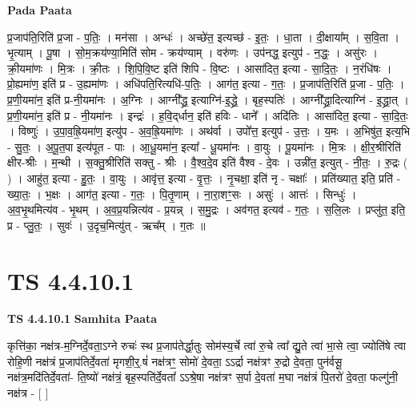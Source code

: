 \documentclass[17pt]{extarticle}
\begin{document}
\textbf{Pada Paata} \newline

प्र॒जाप॑ति॒रिति॑ प्र॒जा - प॒तिः॒ । मन॑सा । अन्धः॑ । अच्छे॑त॒ इत्यच्छ॑ - इ॒तः॒ । धा॒ता । दी॒क्षाया᳚म् । स॒वि॒ता । भृ॒त्याम् । पू॒षा । सो॒म॒क्रय॑ण्या॒मिति॑ सोम - क्रय॑ण्याम् । वरु॑णः । उप॑नद्ध॒ इत्युप॑ - न॒द्धः॒ । असु॑रः । क्री॒यमा॑णः । मि॒त्रः । क्री॒तः । शि॒पि॒वि॒ष्ट इति॑ शिपि - वि॒ष्टः । आसा॑दित॒ इत्या - सा॒दि॒तः॒ । न॒रंधि॑षः । प्रो॒ह्यमा॑ण॒ इति॑ प्र - उ॒ह्यमा॑णः । अधि॑पति॒रित्यधि॑-प॒तिः॒ । आग॑त॒ इत्या - ग॒तः॒ । प्र॒जाप॑ति॒रिति॑ प्र॒जा - प॒तिः॒ । प्र॒णी॒यमा॑न॒ इति॑ प्र-नी॒यमा॑नः । अ॒ग्निः । आग्नी᳚द्ध्र॒ इत्याग्नि॑-इ॒द्ध्रे॒ । बृह॒स्पतिः॑ । आग्नी᳚द्ध्रा॒दित्याग्नि॑ - इ॒द्ध्रा॒त् । प्र॒णी॒यमा॑न॒ इति॑ प्र - नी॒यमा॑नः । इन्द्रः॑ । ह॒वि॒द्‌र्धान॒ इति॑ हविः - धाने᳚ । अदि॑तिः । आसा॑दित॒ इत्या - सा॒दि॒तः॒ । विष्णुः॑ । उ॒पा॒व॒ह्रि॒यमा॑ण॒ इत्यु॑प - अ॒व॒ह्रि॒यमा॑णः । अथ॑र्वा । उपो᳚त्त॒ इत्युप॑ - उ॒त्तः॒ । य॒मः । अ॒भिषु॑त॒ इत्य॒भि - सु॒तः॒ । अ॒पू॒त॒पा इत्य॑पूत - पाः । आ॒धू॒यमा॑न॒ इत्या᳚ - धू॒यमा॑नः । वा॒युः । पू॒यमा॑नः । मि॒त्रः । क्षी॒र॒श्रीरिति॑ क्षीर-श्रीः । म॒न्थी । स॒क्तु॒श्रीरिति॑ सक्तु - श्रीः । वै॒श्व॒दे॒व इति॑ वैश्व - दे॒वः । उन्नी॑त॒ इत्युत् - नी॒तः॒ । रु॒द्रः ( ) । आहु॑त॒ इत्या - हु॒तः॒ । वा॒युः । आवृ॑त्त॒ इत्या - वृ॒त्तः॒ । नृ॒चक्षा॒ इति॑ नृ - चक्षाः᳚ । प्रति॑ख्यात॒ इति॒ प्रति॑ - ख्या॒तः॒ । भ॒क्षः । आग॑त॒ इत्या - ग॒तः॒ । पि॒तृ॒णाम् । ना॒रा॒शꣳ॒॒सः । असुः॑ । आत्तः॑ । सिन्धुः॑ । अ॒व॒भृ॒थमित्य॑व - भृ॒थम् । अ॒व॒प्र॒यन्नित्य॑व - प्र॒यन्न् । स॒मु॒द्रः । अव॑गत॒ इत्यव॑ - ग॒तः॒ । स॒लि॒लः । प्रप्लु॑त॒ इति॒ प्र - प्लु॒तः॒ । सुवः॑ । उ॒दृच॒मित्यु॑त् - ऋच᳚म् । ग॒तः ॥  \newline




\section*{ TS 4.4.10.1 }

\textbf{TS 4.4.10.1 } \newline
\textbf{Samhita Paata} \newline

कृत्ति॑का॒ नक्ष॑त्र-म॒ग्निर्दे॒वता॒ऽग्ने रुचः॑ स्थ प्र॒जाप॑तेर्द्धा॒तुः सोम॑स्य॒र्चे त्वा॑ रु॒चे त्वा᳚ द्यु॒ते त्वा॑ भा॒से त्वा॒ ज्योति॑षे त्वा रोहि॒णी नक्ष॑त्रं प्र॒जाप॑तिर्दे॒वता॑ मृगशी॒र्॒.षं॑ नक्ष॑त्रꣳ॒॒ सोमो॑ दे॒वता॒ ऽऽर्द्रा नक्ष॑त्रꣳ रु॒द्रो दे॒वता॒ पुन॑र्वसू॒ नक्ष॑त्र॒मदि॑तिर्दे॒वता॑- ति॒ष्यो॑ नक्ष॑त्रं॒ बृह॒स्पति॑र्दे॒वता᳚ ऽऽश्रे॒षा नक्ष॑त्रꣳ स॒र्पा दे॒वता॑ म॒घा नक्ष॑त्रं पि॒तरो॑ दे॒वता॒ फल्गु॑नी॒ नक्ष॑त्र - [  ] \newline
\end{document}
